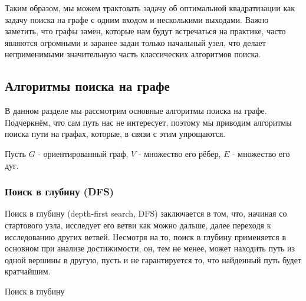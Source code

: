 Таким образом, мы можем трактовать задачу об оптимальной квадратизации как задачу поиска на графе с одним входом и несколькими выходами. Важно заметить, что графы замен, которые нам будут встречаться на практике, часто являются огромными и заранее задан только начальный узел, что делает неприменимыми значительную часть классических алгоритмов поиска.

\subsection{Алгоритмы поиска на графе} \label{search-algo}

В данном разделе мы рассмотрим основные алгоритмы поиска на графе. Подчеркнём, что сам путь нас не интересует, поэтому мы приводим алгоритмы поиска пути на графах, которые, в связи с этим упрощаются.

Пусть $G$ - ориентированный граф, $V$ - множество его рёбер, $E$ - множество его дуг.

\subsubsection{Поиск в глубину (DFS)} \label{DFS-algo}

Поиск в глубину (depth-first search, DFS) заключается в том, что, начиная со стартового узла, исследует его ветви как можно дальше, далее переходя к исследованию других ветвей. Несмотря на то, поиск в глубину применяется в основном при анализе достижимости, он, тем не менее, может находить путь из одной вершины в другую, пусть и не гарантируется то, что найденный путь будет кратчайшим.

\begin{algorithm}[H]
\SetAlgoLined
{}

\caption{Поиск в глубину}
\label{algo:DFS}
\end{algorithm}

